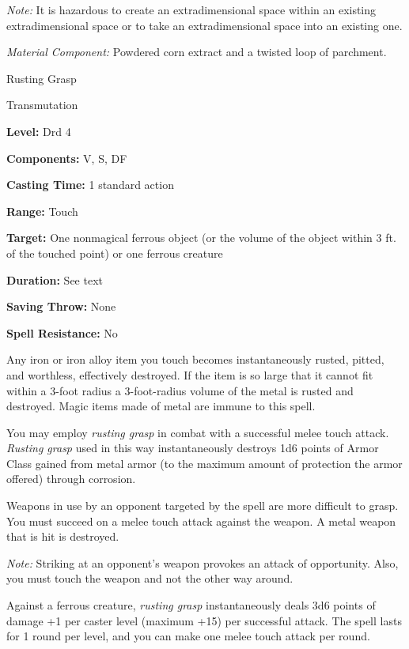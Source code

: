 \documentclass{article}
\begin{document}
\textit{Note: }It is hazardous to create an extradimensional space within an existing 
extradimensional space or to take an extradimensional space into an existing one.

\textit{Material Component: }Powdered corn extract and a twisted loop of parchment.

\vspace{12pt}
Rusting Grasp

Transmutation

\textbf{Level:} Drd 4

\textbf{Components:} V, S, DF

\textbf{Casting Time:} 1 standard action

\textbf{Range:} Touch

\textbf{Target:} One nonmagical ferrous object (or the volume of the object within 
3 ft. of the touched point) or one ferrous creature

\textbf{Duration:} See text

\textbf{Saving Throw:} None

\textbf{Spell Resistance:} No

Any iron or iron alloy item you touch becomes instantaneously rusted, pitted, and 
worthless, effectively destroyed. If the item is so large that it cannot fit within 
a 3-foot radius a 3-foot-radius volume of the metal is rusted and destroyed. Magic 
items made of metal are immune to this spell.

You may employ \textit{rusting grasp }in combat with a successful melee touch attack. 
\textit{Rusting grasp }used in this way instantaneously destroys 1d6 points of 
Armor Class gained from metal armor (to the maximum amount of protection the armor 
offered) through corrosion. 

Weapons in use by an opponent targeted by the spell are more difficult to grasp. 
You must succeed on a melee touch attack against the weapon. A metal weapon that 
is hit is destroyed.

\textit{Note: }Striking at an opponent's weapon provokes an attack of opportunity. 
Also, you must touch the weapon and not the other way around.

Against a ferrous creature, \textit{rusting grasp }instantaneously deals 3d6 points 
of damage +1 per caster level (maximum +15) per successful attack. The spell lasts 
for 1 round per level, and you can make one melee touch attack per round.

\newpage
\end{document}

